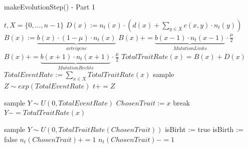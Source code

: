 \documentclass[11pt, a4paper, german]{article}
\theoremstyle{plain}
\begin{document}
	\begin{algorithm}[H]
		\caption{makeEvolutionStep() - Part 1}
		\begin{algorithmic}[1]
			\Require $ t, X = \{0,\dots, n-1\} $
			\Comment{$ \downarrow $ \textcolor[rgb]{0,0,0.55}{calculateEventRates}() $ \downarrow $}
				\State $  D(x) := n_t(x) \cdot \left( d(x) + \sum_{y \in X} c(x,y) \cdot n_t(y) \right) $
				\State $ B(x) := \underbrace{b(x) \cdot (1 - \mu) \cdot n_t(x)}_{arteigene}  $
					\State $ B(x) += \underbrace{b(x-1)\cdot n_t(x-1)}_{Mutation Links} \cdot \frac{\mu}{2} $
				\EndIf
					\State $ B(x) += \underbrace{b(x+1)\cdot n_t(x+1)}_{Mutation Rechts} \cdot \frac{\mu}{2} $
				\EndIf
				\State $ TotalTraitRate(x) = B(x) + D(x) $
			\EndFor
			\State $ TotalEventRate := \sum_{x \in X} TotalTraitRate(x) $
			\State sample $ Z \sim exp(TotalEventRate) $ \Comment{$\downarrow $ \textcolor[rgb]{0,0,0.55}{sampleEventTime}() $ \downarrow $} 
			\State $ t += Z $
			
			\State sample $ Y \sim U(0,TotalEventRate) $ \Comment{$ \downarrow $ \textcolor[rgb]{0,0,0.55}{choseTraitToChange}() $ \downarrow $}
					\State $ ChosenTrait := x $
					\State break
				\EndIf
				\State $ Y -= TotalTraitRate(x) $
			\EndFor 
			
			\State sample $ Y \sim U(0,TotalTraitRate(ChosenTrait)) $
			 \Comment{$ \downarrow $ \textcolor[rgb]{0,0,0.55}{choseEventType()} $ \downarrow $}
				\State isBirht := true
			\Else
				\State isBirth := false
			\EndIf
			 \Comment{$ \downarrow $
				\textcolor[rgb]{0,0,0.55}{executeEventTypeOnTrait()} $ \downarrow $}
				\State $ n_t(ChosenTrait) += 1 $
			\Else
					\State $ n_t(ChosenTrait) -= 1 $
				\EndIf
			\EndIf
		\end{algorithmic}
	\end{algorithm}
	
\end{document}
